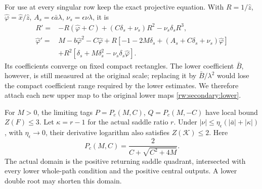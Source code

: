 For use at every singular row keep the exact projective equation.
With $R=1/\hat z$, $\hat\varphi=\hat x/\hat z$,
$A_s=\epsilon\bar a\lambda$, $\nu_s=\epsilon\nu\lambda$, it is
\begin{equation}\label{rw:secondary:projective}
\begin{aligned}
 R'={}&-R(\hat\varphi+C)+(C\delta_s+\nu_s)R^2-\nu_s\delta_sR^3,\\
 \hat\varphi'={}&M-b\hat\varphi^2-C\hat\varphi
 +R[-1-2M\delta_s+(A_s+C\delta_s+\nu_s)\hat\varphi]\\
 &+R^2[\delta_s+M\delta_s^2-\nu_s\delta_s\hat\varphi].
\end{aligned}
\end{equation}
Its coefficients converge on fixed compact rectangles. The lower
coefficient $\bar B$, however, is still measured at the original scale;
replacing it by $\bar B/\lambda^2$ would lose the compact coefficient
range required by the lower estimates. We therefore attach each new
upper map to the original lower maps \eqref{rw:secondary:lower}.

\begin{proposition}
\label{rw:secondary:saddle}
For $M>0$, the limiting tags
$P=P_c(M,C)$, $Q=P_c(M,-C)$ have local bound $Z(F)\le3$.
Let $\kappa=r-1$ for the actual saddle ratio $r$.
Under $|\nu|\le\eta_\epsilon(|\bar a|+|\kappa|)$, with
$\eta_\epsilon\to0$, their derivative logarithm also satisfies
$Z(\mathcal K)\le2$.
Here
\[
 P_c(M,C)=\frac2{C+\sqrt{C^2+4M}} .
\]
The actual domain is the positive returning saddle quadrant, intersected
with every lower whole-path condition and the positive central outputs.
A lower double root may shorten this domain.
\end{proposition}

